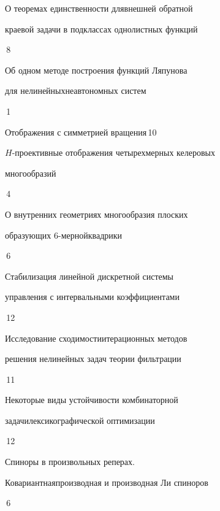 {О теоремах единственности для\newline внешней обратной 


краевой задачи в подклассах однолистных функций}{\No\,8}




{Об одном методе построения функций Ляпунова  


для нелинейных\newline неавтономных систем}{\No\,1}




{Отображения с симметрией вращения}{\No\,10}




{$H$-проективные отображения четырехмерных келеровых\newline


многообразий}{\No\,4}




{О внутренних геометриях многообразия плоских


образующих 6-мерной\newline квадрики}{\No\,6}






{Стабилизация линейной дискретной системы\newline


управления с интервальными коэффициентами}{\No\,12}




{Исследование сходимости\newline итерационных методов 


решения нелинейных задач теории фильтрации}{\No\,11}




{Некоторые виды устойчивости комбинаторной


задачи\newline лексикографической оптимизации}{\No\,12}




{Спиноры в произвольных реперах.


Ковариантная\newline производная и производная Ли спиноров}{\No\,6}




